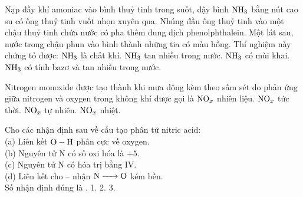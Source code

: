 \documentclass[12pt,a4paper]{article}
\begin{document}
\begin{ex}
Nạp đầy khí amoniac vào bình thuỷ tinh trong suốt, đậy bình $\ce{NH3}$ bằng nút cao su có ống thuỷ tinh vuốt nhọn xuyên qua. Nhúng đầu ống thuỷ tinh vào một chậu thuỷ tinh chứa nước có pha thêm dung dịch phenolphthalein. Một lát sau, nước trong chậu phun vào bình thành những tia có màu hồng. Thí nghiệm này chứng tỏ được:
\choice
{$\ce{NH3}$ là chất khí.}
{$\ce{NH3}$ tan nhiều trong nước.}
{$\ce{NH3}$ có mùi khai.}
{\True $\ce{NH3}$ có tính bazơ và tan nhiều trong nước.}
\end{ex}

\begin{ex}
Nitrogen monoxide được tạo thành khi mưa dông kèm theo sấm sét do phản ứng giữa nitrogen và oxygen trong không khí được gọi là
\choice
{$\ce{NO_x}$ nhiên liệu.}
{$\ce{NO_x}$ tức thời.}
{\True $\ce{NO_x}$ tự nhiên.}
{$\ce{NO_x}$ nhiệt.}
\end{ex}

\begin{ex}
Cho các nhận định sau về cấu tạo phân tử nitric acid:\\
(a) Liên kết $\ce{O - H}$ phân cực về oxygen.\\
(b) Nguyên tử N có số oxi hóa là $+5$.\\
(c) Nguyên tử N có hóa trị bằng IV.\\
(d) Liên kết cho -- nhận $\ce{N -> O}$ kém bền.\\
Số nhận định đúng là
\choice
{.}
{1.}
{2.}
{3.}
\end{ex}
\end{document}
